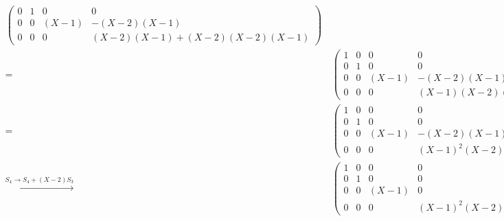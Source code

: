 \begin{align*}
\begin{pmatrix}
      0 & 1 &     0 &                             0 \\
      0 & 0 & (X-1) &                   -(X-2)(X-1) \\
      0 & 0 &     0 &  (X-2)(X-1) + (X-2)(X-2)(X-1)
    \end{pmatrix}
  \\
  =&\,
    \begin{pmatrix}
      1 & 0 &     0 &               0 \\
      0 & 1 &     0 &               0 \\
      0 & 0 & (X-1) &     -(X-2)(X-1) \\
      0 & 0 &     0 & (X-1)(X-2)(X-1)
    \end{pmatrix}
  \\
  =&\,
    \begin{pmatrix}
      1 & 0 &     0 &             0 \\
      0 & 1 &     0 &             0 \\
      0 & 0 & (X-1) &   -(X-2)(X-1) \\
      0 & 0 &     0 & (X-1)^2 (X-2)
    \end{pmatrix}
  \\
  \xrightarrow{S_4 \to S_4 + (X-2) S_3}&\,
    \begin{pmatrix}
      1 & 0 &     0 &             0 \\
      0 & 1 &     0 &             0 \\
      0 & 0 & (X-1) &             0 \\
      0 & 0 &     0 & (X-1)^2 (X-2)
    \end{pmatrix}
\end{align*}

